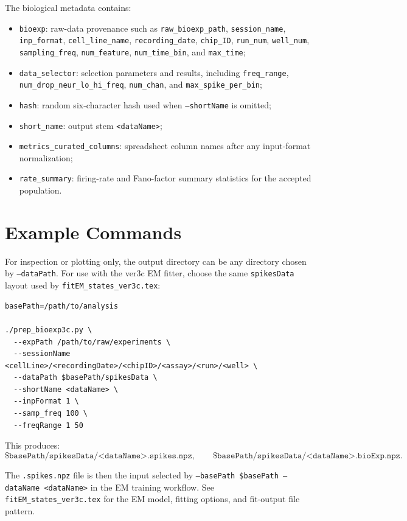 \documentclass[11pt]{article}
\begin{document}
The biological metadata contains:
\begin{itemize}
  \item \texttt{bioexp}: raw-data provenance such as
        \texttt{raw\_bioexp\_path}, \texttt{session\_name},
        \texttt{inp\_format}, \texttt{cell\_line\_name},
        \texttt{recording\_date}, \texttt{chip\_ID}, \texttt{run\_num},
        \texttt{well\_num}, \texttt{sampling\_freq},
        \texttt{num\_feature}, \texttt{num\_time\_bin}, and
        \texttt{max\_time};
  \item \texttt{data\_selector}: selection parameters and results,
        including \texttt{freq\_range},
        \texttt{num\_drop\_neur\_lo\_hi\_freq}, \texttt{num\_chan}, and
        \texttt{max\_spike\_per\_bin};
  \item \texttt{hash}: random six-character hash used when
        \texttt{--shortName} is omitted;
  \item \texttt{short\_name}: output stem \texttt{<dataName>};
  \item \texttt{metrics\_curated\_columns}: spreadsheet column names after
        any input-format normalization;
  \item \texttt{rate\_summary}: firing-rate and Fano-factor summary
        statistics for the accepted population.
\end{itemize}

\section{Example Commands}
\label{sec:commands}

For inspection or plotting only, the output directory can be any directory
chosen by \texttt{--dataPath}. For use with the ver3c EM fitter, choose the
same \texttt{spikesData} layout used by \texttt{fitEM\_states\_ver3c.tex}:
\begin{verbatim}
basePath=/path/to/analysis

./prep_bioexp3c.py \
  --expPath /path/to/raw/experiments \
  --sessionName <cellLine>/<recordingDate>/<chipID>/<assay>/<run>/<well> \
  --dataPath $basePath/spikesData \
  --shortName <dataName> \
  --inpFormat 1 \
  --samp_freq 100 \
  --freqRange 1 50
\end{verbatim}

This produces:
\[
\texttt{\$basePath/spikesData/<dataName>.spikes.npz},
\qquad
\texttt{\$basePath/spikesData/<dataName>.bioExp.npz}.
\]

The \texttt{.spikes.npz} file is then the input selected by
\texttt{--basePath \$basePath --dataName <dataName>} in the EM training
workflow. See \texttt{fitEM\_states\_ver3c.tex} for the EM model, fitting
options, and fit-output file pattern.
\end{document}
